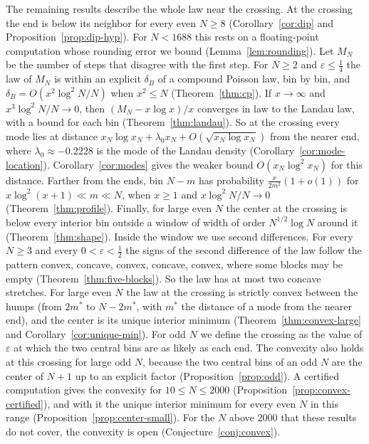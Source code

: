 The remaining results describe the whole law near the crossing. At the
crossing the end is below its neighbor for every even $N\ge8$
(Corollary~\ref{cor:dip} and Proposition~\ref{prop:dip-hyp}). For $N<1688$
this rests on a floating-point computation whose rounding error we bound
(Lemma~\ref{lem:rounding}). Let $M_N$ be the number of steps that disagree
with the first step. For $N\ge2$ and $\varepsilon\le\frac14$ the law of $M_N$
is within an explicit $\delta_B$ of a compound Poisson law, bin by bin, and
$\delta_B=O(x^2\log^2N/N)$ when $x^2\le N$ (Theorem~\ref{thm:cp}). If
$x\to\infty$ and $x^3\log^2N/N\to0$, then $(M_N-x\log x)/x$ converges in law
to the Landau law, with a bound for each bin (Theorem~\ref{thm:landau}). So at
the crossing every mode lies at distance
$x_N\log x_N+\lambda_0x_N+O(\sqrt{x_N\log x_N})$ from the nearer end, where
$\lambda_0\approx-0.2228$ is the mode of the Landau density
(Corollary~\ref{cor:mode-location}). Corollary~\ref{cor:modes} gives the
weaker bound $O(x_N\log^2x_N)$ for this distance. Farther from the ends, bin $N-m$ has
probability $\frac x{2m^2}(1+o(1))$ for $x\log^2(x+1)\ll m\ll N$, when
$x\ge1$ and $x\log^2N/N\to0$ (Theorem~\ref{thm:profile}). Finally, for large
even $N$ the center at the crossing is below every interior bin outside a
window of width of order $N^{1/2}\log N$ around it
(Theorem~\ref{thm:shape}). Inside the window we use second differences. For every
$N\ge3$ and every $0<\varepsilon<\frac12$ the signs of the second difference
of the law follow the pattern convex, concave, convex, concave, convex, where
some blocks may be empty (Theorem~\ref{thm:five-blocks}). So the law has at
most two concave stretches. For large even $N$ the law at the
crossing is strictly convex between the humps (from $2m^*$ to $N-2m^*$, with
$m^*$ the distance of a mode from the nearer end), and the center is its unique
interior minimum (Theorem~\ref{thm:convex-large} and
Corollary~\ref{cor:unique-min}). For odd $N$ we define the crossing as the
value of $\varepsilon$ at which the two central bins are as likely as each end.
The convexity also holds at this crossing for large odd $N$, because the two
central bins of an odd $N$ are the center of $N+1$ up to an explicit factor
(Proposition~\ref{prop:odd}). A certified computation gives the convexity
for $10\le N\le2000$ (Proposition~\ref{prop:convex-certified}), and with it the unique interior
minimum for every even $N$ in this range (Proposition~\ref{prop:center-small}). For
the $N$ above $2000$ that these results do not cover, the convexity is open
(Conjecture~\ref{conj:convex}).

